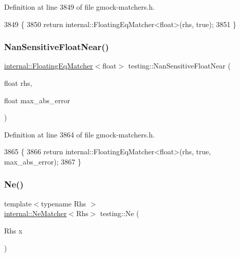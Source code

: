 Definition at line 3849 of file gmock-\/matchers.\+h.


\begin{DoxyCode}
3849                                                                        \{
3850   \textcolor{keywordflow}{return} internal::FloatingEqMatcher<float>(rhs, \textcolor{keyword}{true});
3851 \}
\end{DoxyCode}
\mbox{\label{namespacetesting_a347ebf0075ca9470e71e8ac468c9818f}} 
\subsubsection{\texorpdfstring{Nan\+Sensitive\+Float\+Near()}{NanSensitiveFloatNear()}}
{\footnotesize\ttfamily \hyperlink{classtesting_1_1internal_1_1FloatingEqMatcher}{internal\+::\+Floating\+Eq\+Matcher}$<$float$>$ testing\+::\+Nan\+Sensitive\+Float\+Near (\begin{DoxyParamCaption}\item[{float}]{rhs,  }\item[{float}]{max\+\_\+abs\+\_\+error }\end{DoxyParamCaption})\hspace{0.3cm}{\ttfamily [inline]}}



Definition at line 3864 of file gmock-\/matchers.\+h.


\begin{DoxyCode}
3865                                     \{
3866   \textcolor{keywordflow}{return} internal::FloatingEqMatcher<float>(rhs, \textcolor{keyword}{true}, max\_abs\_error);
3867 \}
\end{DoxyCode}
\mbox{\label{namespacetesting_afe42d41d5171234cb9da5da27faeb7e8}} 
\subsubsection{\texorpdfstring{Ne()}{Ne()}\hspace{0.1cm}{\footnotesize\ttfamily [1/2]}}
{\footnotesize\ttfamily template$<$typename Rhs $>$ \\
\hyperlink{classtesting_1_1internal_1_1NeMatcher}{internal\+::\+Ne\+Matcher}$<$Rhs$>$ testing\+::\+Ne (\begin{DoxyParamCaption}\item[{Rhs}]{x }\end{DoxyParamCaption})\hspace{0.3cm}{\ttfamily [inline]}}



